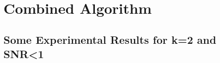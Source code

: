 \chapter{Combined Algorithm} \label{chapter 4}
\section{Some Experimental Results for k=2 and SNR<1}
